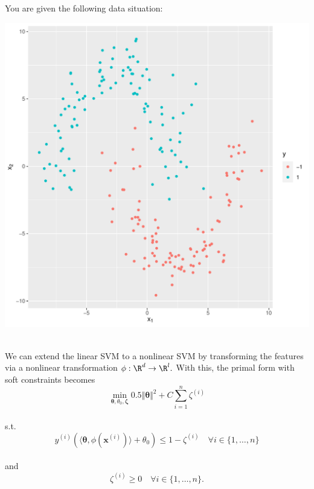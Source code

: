 You are given the following data situation:
\begin{knitrout}
\color{fgcolor}\begin{kframe}
\begin{alltt}

\hlstd{(}\hlstd{)}
 \hlkwb{=} \hlstd{(}\hlstd{)}\hlopt{$}\hlstd{(}\hlstd{)}\hlopt{$}\hlstd{()}

\hlopt{$} \hlkwb{=} \hlopt{$} \hlopt{==} \hlstd{,} \hlstd{,} \hlopt{-}\hlstd{)}
\hlopt{$} \hlkwb{=} \hlopt{$}

 \hlstd{(}  \hlopt{+}
  \hlstd{(}\hlstd{(} \hlopt{+}
  \hlstd{(}\hlstd{(x[}\hlstd{]))} \hlopt{+}
  \hlstd{(}\hlstd{(x[}\hlstd{]))} \hlopt{+}
  \hlstd{(}\hlstd{=}
\end{alltt}
\end{kframe}
\includegraphics[width=0.5\linewidth]{figure/nonlindata-plot-1} 
\end{knitrout}
\\ 
We can extend the linear SVM to a nonlinear SVM by transforming the features via a nonlinear transformation $\phi:\R^d \rightarrow \R^l.$ With this, the primal form with soft constraints becomes
$$\min_{\bm{\theta}, \theta_0, \bm{\zeta}} 0.5\Vert \bm{\theta} \Vert^2 + C\sum^n_{i=1}\zeta^{(i)}$$ \\
s.t. $$y^{(i)}(\langle\bm{\theta}, \phi(\mathbf{x}^{(i)})\rangle + \theta_0) \leq 1 - \zeta^{(i)}\quad\forall i \in\{1,\dots,n\}$$ \\
and  
$$\zeta^{(i)} \geq 0\quad \forall i \in\{1,\dots,n\}.$$

